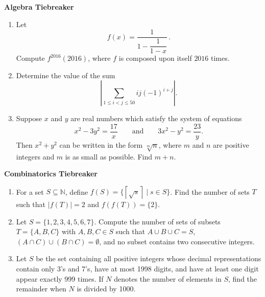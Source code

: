 \documentclass[10pt]{article}
\begin{document}
\vspace*{0.13in}
\begin{center}
\huge\textbf{Algebra Tiebreaker}\normalsize

\vspace{3pt}
\end{center}

\begin{enumerate}

\item Let \[f(x)=\dfrac{1}{1-\dfrac{1}{1-x}}\,.\] Compute $f^{2016}(2016)$, where $f$ is composed upon itself $2016$ times.

\item Determine the value of the sum \[\left|\sum_{1\leq i<j\leq 50}ij(-1)^{i+j}\right|.\]

\item Suppose $x$ and $y$ are real numbers which satisfy the system of equations \[x^2-3y^2=\frac{17}x\qquad\text{and}\qquad 3x^2-y^2=\frac{23}y.\] Then $x^2+y^2$ can be written in the form $\sqrt[m]{n}$, where $m$ and $n$ are positive integers and $m$ is as small as possible.  Find $m+n$.

\end{enumerate}

\newpage

\begin{center}
\huge\textbf{Combinatorics Tiebreaker}\normalsize

\vspace{3pt}
\end{center}

\begin{enumerate}

\item For a set $S \subseteq \mathbb{N}$, define $f(S) = \{\left\lceil \sqrt{s} \right\rceil \mid s \in S\}$. Find the number of sets $T$ such that $\vert f(T) \vert = 2$ and $f(f(T)) = \{2\}$. %

\item Let $S = \{1,2,3,4,5,6,7\}$. Compute the number of sets of subsets $T = \{A, B, C\}$ with $A, B, C \in S$ such that $A \cup B \cup C = S$, $(A \cap C) \cup (B \cap C) = \emptyset$, and no subset contains two consecutive integers. %

\item Let $S$ be the set containing all positive integers whose decimal representations contain only 3’s and 7’s, have at most 1998 digits, and have at least one digit appear exactly 999 times. If $N$ denotes the number of elements in $S$, find the remainder when $N$ is divided by 1000. %

\end{enumerate}
\end{document}
